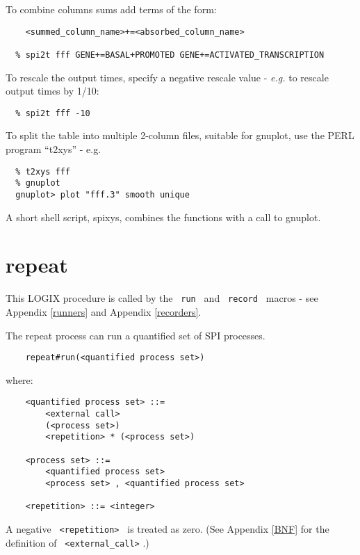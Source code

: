\noindent
To combine columns sums add terms of the form:

\begin{verbatim}
    <summed_column_name>+=<absorbed_column_name>

  % spi2t fff GENE+=BASAL+PROMOTED GENE+=ACTIVATED_TRANSCRIPTION
\end{verbatim}

\noindent
To rescale the output times, specify a negative rescale value - {\em e.g.}
to rescale output times by 1/10:
\begin{verbatim}
  % spi2t fff -10
\end{verbatim}

\noindent
To split the table into multiple 2-column files, suitable for gnuplot,
use the PERL program ``t2xys'' - e.g.

\begin{verbatim}
  % t2xys fff
  % gnuplot
  gnuplot> plot "fff.3" smooth unique
\end{verbatim}

\noindent
A short shell script, spixys, combines the functions with a call to gnuplot.

\section{repeat}
\label{repeat}
This LOGIX procedure is called by the \verb+ run + and
\verb+ record + macros - see Appendix \ref{runners} and
Appendix \ref{recorders}.

\noindent
The repeat process can run a quantified set of SPI
processes.

\begin{verbatim}
    repeat#run(<quantified process set>)
\end{verbatim}

\noindent
where:

\begin{verbatim}
    <quantified process set> ::=
        <external call>
        (<process set>)
        <repetition> * (<process set>)

    <process set> ::=
        <quantified process set>
        <process set> , <quantified process set>

    <repetition> ::= <integer>
\end{verbatim}

\noindent
A negative \verb+ <repetition> + is treated as zero.
\noindent
(See Appendix \ref{BNF} for the definition of \verb+ <external_call>+ .)

